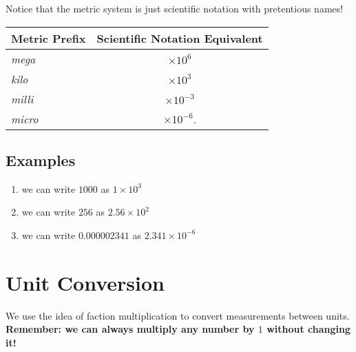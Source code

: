 \documentclass[11pt, oneside]{article}   	%
\begin{document}
Notice that the metric system is just scientific notation with pretentious names!

\begin{center}
\begin{tabular}[hbpt]{|l|c|}
\hline
Metric Prefix & Scientific Notation Equivalent \\
\hline
\emph{mega}  &  $ \times 10^{6} $   \\
\emph{kilo}      &  $ \times 10^{3} $   \\
\emph{milli}     &  $ \times 10^{-3} $  \\
\emph{micro}  &  $ \times 10^{-6} $.  \\
\hline
\end{tabular}
\end{center}

\subsection{Examples}
\begin{enumerate}[label=Example \arabic*]
\item we can write $1000$ as $1 \times 10^{3}$
\item we can write $256$ as $2.56 \times 10^{2}$
\item we can write $0.000002341$ as $ 2.341 \times 10^{-6} $
\end{enumerate}


\section{Unit Conversion}
We use the idea of faction multiplication to convert measurements between units. \textbf{Remember: we can always multiply any number by $1$ without changing it!}
\end{document}
